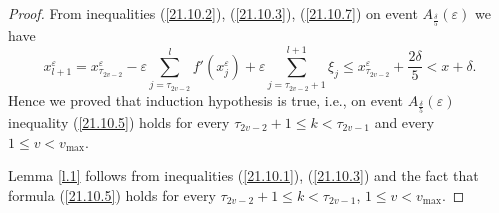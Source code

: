 \documentclass[10pt,a4paper]{amsart}
\begin{document}
\begin{proof}
From inequalities (\ref{21.10.2}), (\ref{21.10.3}), (\ref{21.10.7}) on event $A_{\frac{\delta}{5}}\left(\varepsilon\right)$ we have
$$
x_{l+1}^{\varepsilon}=x_{\tau_{2v-2}}^{\varepsilon}-\varepsilon \sum\limits_{j=\tau_{2v-2}}^{l}f'(x_j^{\varepsilon})
+\varepsilon\sum\limits_{j=\tau_{2v-2}+1}^{l+1}\xi_j
\leqslant x_{\tau_{2v-2}}^{\varepsilon}+\frac{2\delta}{5}<x+\delta.
$$
Hence we proved that induction hypothesis is true, i.e., on event $A_{\frac{\delta}{5}}\left(\varepsilon\right)$ inequality (\ref{21.10.5})
holds for every $\tau_{2v-2}+1\leqslant k< \tau_{2v-1}$ and every $1\leqslant v < v_{\max}$.

Lemma \ref{l.1} follows from inequalities (\ref{21.10.1}), (\ref{21.10.3})
and the fact that formula (\ref{21.10.5})
holds for every $\tau_{2v-2}+1\leqslant k< \tau_{2v-1}$, $1\leqslant v < v_{\max}$.
\end{proof}
\end{document}
